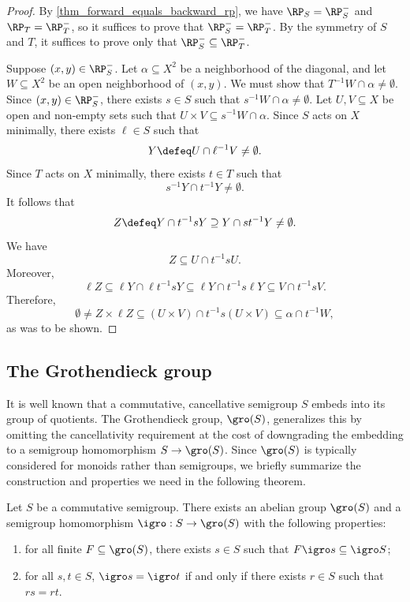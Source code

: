 \begin{proof}
    By \cref{thm_forward_equals_backward_rp}, we have $\RP_S = \RP_S^-$ and $\RP_T = \RP_T^-$, so it suffices to prove that $\RP_S^- = \RP_T^-$. By the symmetry of $S$ and $T$, it suffices to prove only that $\RP_S^- \subseteq \RP_T^-$.
    
    Suppose $(x,y) \in \RP_S^-$.  Let $\alpha \subseteq X^2$ be a neighborhood of the diagonal, and let $W \subseteq X^2$ be an open neighborhood of $(x,y)$.  We must show that $T^{-1} W \cap \alpha \neq \emptyset$.
    Since $(x,y) \in \RP_S^-$, there exists $s \in S$ such that $s^{-1} W \cap \alpha \neq \emptyset$.  Let $U, V \subseteq X$ be open and non-empty sets such that $U \times V \subseteq s^{-1} W \cap \alpha$.
    Since $S$ acts on $X$ minimally, there exists $\ell \in S$ such that
    \[Y \defeq U \cap \ell^{-1} V \neq \emptyset.\]
    Since $T$ acts on $X$ minimally, there exists  $t \in T$ such that
    \[s^{-1} Y \cap t^{-1} Y \neq \emptyset.\]
    It follows that
    \[
        Z \defeq Y \cap t^{-1} s Y \supseteq Y \cap s t^{-1} Y \neq \emptyset.
    \]
    We have
    \[
        Z \subseteq U \cap t^{-1} s U.
    \]
    Moreover, 
    \[
        \ell Z \subseteq \ell Y \cap \ell t^{-1} s Y \subseteq \ell Y \cap t^{-1} s \ell Y \subseteq V \cap t^{-1} s V.
    \]
    Therefore,
    \[\emptyset \neq Z \times \ell Z \subseteq (U \times V) \cap t^{-1} s (U \times V) \subseteq \alpha \cap t^{-1} W,\]
    as was to be shown.
\end{proof}

\subsection{The Grothendieck group}
\label{sec_gro_gp}

It is well known that a commutative, cancellative semigroup $S$ embeds into its group of quotients.
The Grothendieck group, $\gro(S)$, generalizes this by omitting the cancellativity requirement at the cost of downgrading the embedding to a semigroup homomorphism $S \to \gro(S)$.
Since $\gro(S)$ is typically considered for monoids rather than semigroups, we briefly summarize the construction and properties we need in the following theorem.


\begin{theorem}
\label{thm_gro_group_props}
    Let $S$ be a commutative semigroup.  There exists an abelian group $\gro(S)$ and a semigroup homomorphism $\igro: S \to \gro(S)$ with the following properties:
    \begin{enumerate}
        \item for all finite $F \subseteq \gro(S)$, there exists $s \in S$ such that $F \igro s \subseteq \igro S$;
        \item for all $s, t \in S$, $\igro s = \igro t$ if and only if there exists $r \in S$ such that $rs = rt$.
    \end{enumerate}
\end{theorem}

